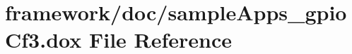 \hypertarget{sample_apps__gpio_cf3_8dox}{}\section{framework/doc/sample\+Apps\+\_\+gpio\+Cf3.dox File Reference}
\label{sample_apps__gpio_cf3_8dox}

